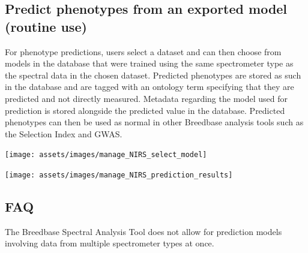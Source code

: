 \documentclass[
  12pt,
]{book}
\begin{document}
\hypertarget{predict-phenotypes-from-an-exported-model-routine-use}{%
\subsection{Predict phenotypes from an exported model (routine use)}\label{predict-phenotypes-from-an-exported-model-routine-use}}

For phenotype predictions, users select a dataset and can then choose from models in the database that were trained using the same spectrometer type as the spectral data in the chosen dataset. Predicted phenotypes are stored as such in the database and are tagged with an ontology term specifying that they are predicted and not directly measured. Metadata regarding the model used for prediction is stored alongside the predicted value in the database. Predicted phenotypes can then be used as normal in other Breedbase analysis tools such as the Selection Index and GWAS.

\begin{center}\texttt{[image: assets/images/manage\_NIRS\_select\_model]} \end{center}

\begin{center}\texttt{[image: assets/images/manage\_NIRS\_prediction\_results]} \end{center}

\hypertarget{faq}{%
\subsection{FAQ}\label{faq}}

The Breedbase Spectral Analysis Tool does not allow for prediction models involving data from multiple spectrometer types at once.
\end{document}
